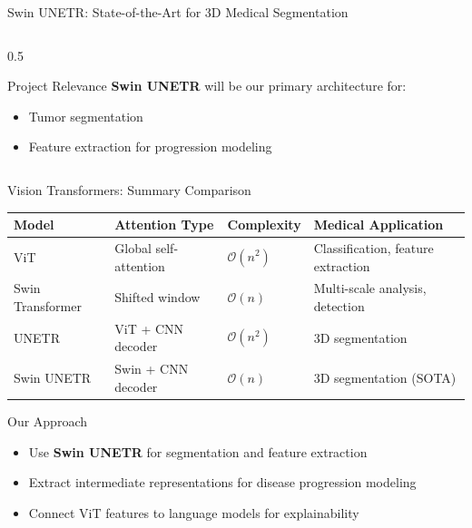 \documentclass[aspectratio=169]{beamer}
\begin{document}
\begin{frame}{Swin UNETR: State-of-the-Art for 3D Medical Segmentation}
\begin{columns}
\begin{column}{0.5\textwidth}
            \begin{alertblock}{Project Relevance}
                \textbf{Swin UNETR} will be our primary architecture for:
                \begin{itemize}
                    \item Tumor segmentation
                    \item Feature extraction for progression modeling
                \end{itemize}
            \end{alertblock}
        \end{column}
    \end{columns}
\end{frame}

\begin{frame}{Vision Transformers: Summary Comparison}
    \begin{center}
        \begin{tabular}{@{}p{2.5cm}p{3cm}p{3.5cm}p{4cm}@{}}
            \toprule
            \textbf{Model} & \textbf{Attention Type} & \textbf{Complexity} & \textbf{Medical Application} \\
            \midrule
            ViT & Global self-attention & $\mathcal{O}(n^2)$ & Classification, feature extraction \\[8pt]
            Swin Transformer & Shifted window & $\mathcal{O}(n)$ & Multi-scale analysis, detection \\[8pt]
            UNETR & ViT + CNN decoder & $\mathcal{O}(n^2)$ & 3D segmentation \\[8pt]
            Swin UNETR & Swin + CNN decoder & $\mathcal{O}(n)$ & 3D segmentation (SOTA) \\
            \bottomrule
        \end{tabular}
    \end{center}
    
    \vspace{1em}
    
    \begin{alertblock}{Our Approach}
        \begin{itemize}
            \item Use \textbf{Swin UNETR} for segmentation and feature extraction
            \item Extract intermediate representations for disease progression modeling
            \item Connect ViT features to language models for explainability
        \end{itemize}
    \end{alertblock}
\end{frame}
\end{document}
